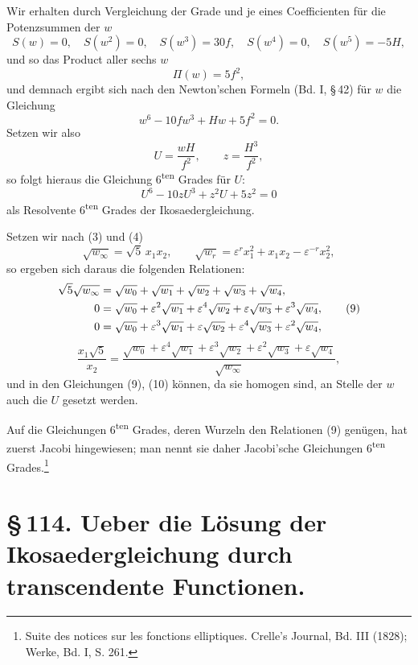 \documentclass[11pt]{article}
\providecommand{\eps}{\varepsilon}
\providecommand{\eps}{\varepsilon}
\begin{document}
Wir erhalten durch Vergleichung der Grade und je eines Coefficienten für die Potenzsummen der \(w\)
\[
S(w)=0,
\quad
S(w^2)=0,
\quad
S(w^3)=30f,
\quad
S(w^4)=0,
\quad
S(w^5)=-5H,
\]
und so das Product aller sechs \(w\)
\[
\Pi(w)=5f^2,
\]
und demnach ergibt sich nach den Newton'schen Formeln (Bd. I, \S\,42) für \(w\) die Gleichung
\begin{equation}
w^6-10fw^3+Hw+5f^2=0.
\tag{5}
\end{equation}
Setzen wir also
\begin{equation}
U=\frac{wH}{f^2},
\qquad
z=\frac{H^3}{f^2},
\tag{6}
\end{equation}
so folgt hieraus die Gleichung 6\textsuperscript{ten} Grades für \(U\):
\begin{equation}
U^6-10zU^3+z^2U+5z^2=0
\tag{7}
\end{equation}
als Resolvente 6\textsuperscript{ten} Grades der Ikosaedergleichung.

Setzen wir nach (3) und (4)
\begin{equation}
\sqrt{w_\infty}=\sqrt5\,x_1x_2,
\qquad
\sqrt{w_r}=\eps^r x_1^2+x_1x_2-\eps^{-r}x_2^2,
\tag{8}
\end{equation}
so ergeben sich daraus die folgenden Relationen:
\begin{align}
\sqrt5\sqrt{w_\infty}&=\sqrt{w_0}+\sqrt{w_1}+\sqrt{w_2}+\sqrt{w_3}+\sqrt{w_4},\notag\\
0&=\sqrt{w_0}+\eps^2\sqrt{w_1}+\eps^4\sqrt{w_2}+\eps\sqrt{w_3}+\eps^3\sqrt{w_4},\tag{9}\\
0&=\sqrt{w_0}+\eps^3\sqrt{w_1}+\eps\sqrt{w_2}+\eps^4\sqrt{w_3}+\eps^2\sqrt{w_4},\notag
\end{align}
\begin{equation}
\frac{x_1\sqrt5}{x_2}=\frac{\sqrt{w_0}+\eps^4\sqrt{w_1}+\eps^3\sqrt{w_2}+\eps^2\sqrt{w_3}+\eps\sqrt{w_4}}{\sqrt{w_\infty}},
\tag{10}
\end{equation}
und in den Gleichungen (9), (10) können, da sie homogen sind, an Stelle der \(w\) auch die \(U\) gesetzt werden.

Auf die Gleichungen 6\textsuperscript{ten} Grades, deren Wurzeln den Relationen (9) genügen, hat zuerst Jacobi hingewiesen; man nennt sie daher Jacobi'sche Gleichungen 6\textsuperscript{ten} Grades.\footnote{Suite des notices sur les fonctions elliptiques. Crelle's Journal, Bd. III (1828); Werke, Bd. I, S. 261.}

\section*{\S\,114. Ueber die Lösung der Ikosaedergleichung durch transcendente Functionen.}
\end{document}
